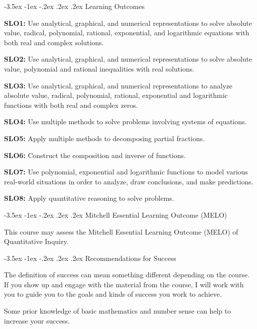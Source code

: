 \documentclass{article}
\makeatletter
\renewcommand\section{\@startsection{section}{1}{0pt}%
  {-3.5ex \@plus -1ex \@minus -.2ex}%
  {.2ex \@plus.2ex}%
  {\normalfont\Large\bfseries}} %
\makeatother
\begin{document}
\section{Learning Outcomes}

\textbf{SLO1:} Use analytical, graphical, and numerical representations to solve absolute value, radical, polynomial, rational, exponential, and logarithmic equations with both real and complex solutions.

\textbf{SLO2:} Use analytical, graphical, and numerical representations to solve absolute value, polynomial and rational inequalities with real solutions.

\textbf{SLO3:} Use analytical, graphical, and numerical representations to analyze absolute value, radical, polynomial, rational, exponential and logarithmic functions with both real and complex zeros.

\textbf{SLO4:} Use multiple methods to solve problems involving systems of equations.

\textbf{SLO5:} Apply multiple methods to decomposing partial fractions.

\textbf{SLO6:} Construct the composition and inverse of functions.

\textbf{SLO7:} Use polynomial, exponential and logarithmic functions to model various real-world situations in order to analyze, draw conclusions, and make predictions.

\textbf{SLO8:} Apply quantitative reasoning to solve problems.

\section{Mitchell Essential Learning Outcome (MELO)}

This course may assess the Mitchell Essential Learning Outcome (MELO) of Quantitative Inquiry.

\section{Recommendations for Success}

The definition of success can mean something different depending on the course. If you show up and engage with the material from the course, I will work with you to guide you to the goals and kinds of success you work to achieve.

Some prior knowledge of basic mathematics and number sense can help to increase your success.
\end{document}

